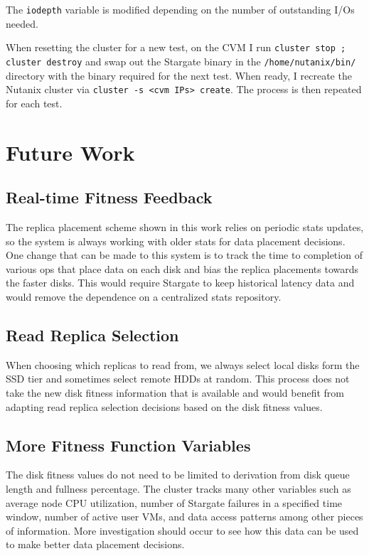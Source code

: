 \documentclass[12pt]{article}
\begin{document}
  The \verb|iodepth| variable is modified depending on the number of
  outstanding I/Os needed.

  When resetting the cluster for a new test, on the CVM I run
  \verb|cluster stop ; cluster destroy| and swap out the Stargate binary in
  the \verb|/home/nutanix/bin/| directory with the binary required for the next
  test. When ready, I recreate the Nutanix cluster via
  \verb|cluster -s <cvm IPs> create|. The process is then repeated for each
  test.

\newpage
\section{Future Work}

  \subsection{Real-time Fitness Feedback}

  The replica placement scheme shown in this work relies on periodic stats
  updates, so the system is always working with older stats for data placement
  decisions. One change that can be made to this system is to track the time to
  completion of various ops that place data on each disk and bias the replica
  placements towards the faster disks. This would require Stargate to keep
  historical latency data and would remove the dependence on a centralized
  stats repository.

  \subsection{Read Replica Selection}

  When choosing which replicas to read from, we always select local disks
  form the SSD tier and sometimes select remote HDDs at random. This process
  does not take the new disk fitness information that is available and would
  benefit from adapting read replica selection decisions based on the disk
  fitness values.

  \subsection{More Fitness Function Variables}

  The disk fitness values do not need to be limited to derivation from disk
  queue length and fullness percentage. The cluster tracks many other variables
  such as average node CPU utilization, number of Stargate failures in a
  specified time window, number of active user VMs, and data access patterns
  among other pieces of information. More investigation should occur to see how
  this data can be used to make better data placement decisions.
\end{document}
